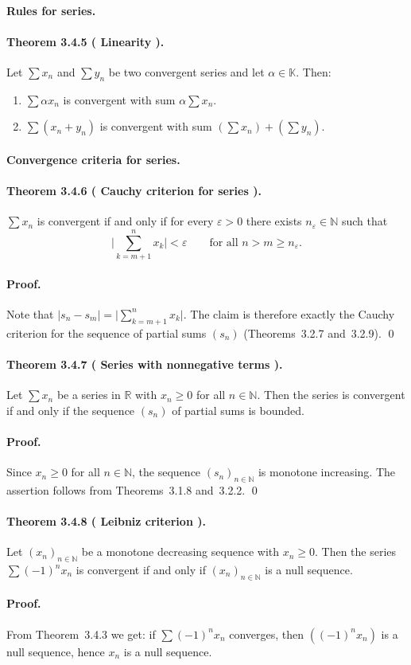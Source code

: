 \documentclass[12pt]{article}
\newcommand{\N}{\mathbb{N}}
\newcommand{\R}{\mathbb{R}}
\newcommand{\K}{\mathbb{K}} %
\newcommand{\eps}{\varepsilon}
\newcommand{\NumberedTheorem}[3]{%
\paragraph*{Theorem #1 ( #2 ).} #3\par}
\begin{document}
\paragraph{Rules for series.}

\NumberedTheorem{3.4.5}{Linearity}{Let $\sum x_n$ and $\sum y_n$ be two convergent series and let $\alpha\in\K$. Then:
\begin{enumerate}[label={(\arabic*)}, leftmargin=*]
	\item $\sum \alpha x_n$ is convergent with sum $\alpha\sum x_n$.
	\item $\sum (x_n+y_n)$ is convergent with sum $(\sum x_n) + (\sum y_n)$.
\end{enumerate}}

\paragraph{Convergence criteria for series.}

\NumberedTheorem{3.4.6}{Cauchy criterion for series}{$\sum x_n$ is convergent if and only if for every $\eps>0$ there exists $n_\eps\in\N$ such that
\[
	\Bigg|\sum_{k=m+1}^{n} x_k\Bigg| < \eps \qquad \text{for all } n>m\ge n_\eps.
\]}
\paragraph{Proof.}
Note that $|s_n-s_m| = \big|\sum_{k=m+1}^{n} x_k\big|$. The claim is therefore exactly the Cauchy criterion for the sequence of partial sums $(s_n)$ (Theorems~3.2.7 and~3.2.9). \qed

\NumberedTheorem{3.4.7}{Series with nonnegative terms}{Let $\sum x_n$ be a series in $\R$ with $x_n\ge0$ for all $n\in\N$. Then the series is convergent if and only if the sequence $(s_n)$ of partial sums is bounded.}
\paragraph{Proof.}
Since $x_n\ge0$ for all $n\in\N$, the sequence $(s_n)_{n\in\N}$ is monotone increasing. The assertion follows from Theorems~3.1.8 and~3.2.2. \qed

\NumberedTheorem{3.4.8}{Leibniz criterion}{Let $(x_n)_{n\in\N}$ be a monotone decreasing sequence with $x_n\ge0$. Then the series $\sum (-1)^n x_n$ is convergent if and only if $(x_n)_{n\in\N}$ is a null sequence.}
\paragraph{Proof.}
From Theorem~3.4.3 we get: if $\sum (-1)^n x_n$ converges, then $((-1)^n x_n)$ is a null sequence, hence $x_n$ is a null sequence.
\end{document}
